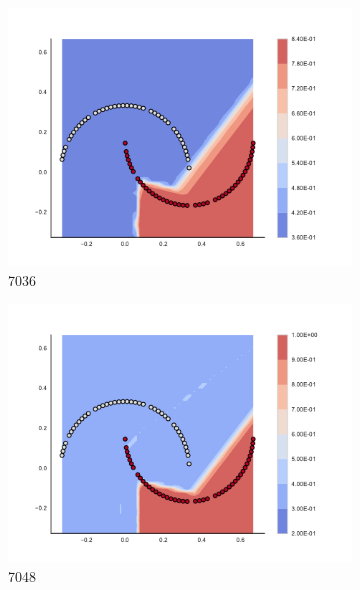 \begin{figure}[h]
\begin{subfigure}[b]{0.09\textwidth}
    \includegraphics[clip, trim=2.35cm 1.75cm 4.5cm 0cm,width=\textwidth]{img/convergence/7036.pdf}
    \caption{7036}
    \label{fig:convergence_7036}
\end{subfigure}
%
\begin{subfigure}[b]{0.09\textwidth}
    \includegraphics[clip, trim=2.35cm 1.75cm 4.5cm 0cm,width=\textwidth]{img/convergence/7048.pdf}
    \caption{7048}
    \label{fig:convergence_7048}
\end{subfigure}
%
\begin{subfigure}[b]{0.09\textwidth}

\end{subfigure}
\end{figure}
